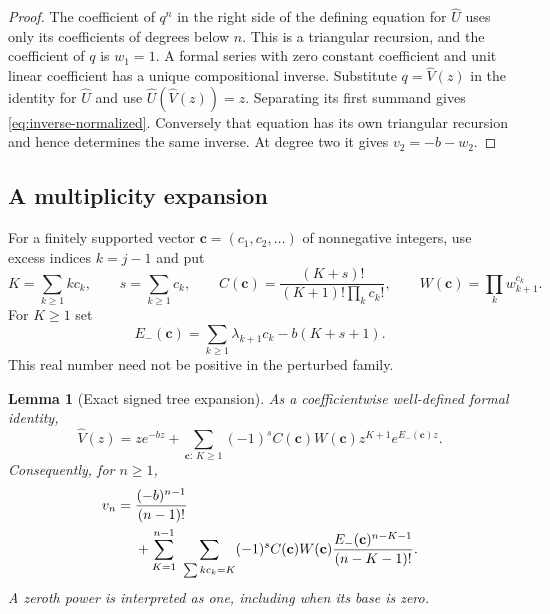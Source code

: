 \documentclass[11pt,a4paper]{article}
\numberwithin{equation}{section}
\newtheorem{lemma}[theorem]{Lemma}
\theoremstyle{definition}
\theoremstyle{remark}
\newcommand{\Uhat}{\widehat U}\newcommand{\Vhat}{\widehat V}
\begin{document}
\begin{proof}
The coefficient of $q^n$ in the right side of the defining equation for
$\Uhat$ uses only its coefficients of degrees below $n$. This is a
triangular recursion, and the coefficient of $q$ is $w_1=1$.
A formal series with zero constant coefficient and unit linear coefficient
has a unique compositional inverse. Substitute $q=\Vhat(z)$ in the
identity for $\Uhat$ and use $\Uhat(\Vhat(z))=z$. Separating its first
summand gives \eqref{eq:inverse-normalized}. Conversely that equation
has its own triangular recursion and hence determines the same inverse.
At degree two it gives $v_2=-b-w_2$.
\end{proof}

\subsection{A multiplicity expansion}

For a finitely supported vector $\mathbf c=(c_1,c_2,\ldots)$ of
nonnegative integers, use excess indices $k=j-1$ and put
\begin{equation}
 K=\sum_{k\ge1}k c_k,\qquad s=\sum_{k\ge1}c_k,\qquad
 C(\mathbf c)=\frac{(K+s)!}{(K+1)!\prod_k c_k!},\qquad
 W(\mathbf c)=\prod_k w_{k+1}^{c_k}.
 \label{eq:multiplicities}
\end{equation}
For $K\ge1$ set
\begin{equation}
 E_-(\mathbf c)=\sum_{k\ge1}\lambda_{k+1}c_k-b(K+s+1).
 \label{eq:minus-energy}
\end{equation}
This real number need not be positive in the perturbed family.

\begin{lemma}[Exact signed tree expansion]
\label{lem:tree}
As a coefficientwise well-defined formal identity,
\begin{equation}
 \Vhat(z)=z e^{-bz}
 +\sum_{\mathbf c:\,K\ge1}(-1)^s C(\mathbf c)W(\mathbf c)
                         z^{K+1}e^{E_-(\mathbf c)z}.
 \label{eq:tree}
\end{equation}
Consequently, for $n\ge1$,
\begin{align}
 v_n={}&\frac{(-b)^{n-1}}{(n-1)!}\notag\\
 &+\sum_{K=1}^{n-1}\ \sum_{\sum k c_k=K}
 (-1)^s C(\mathbf c)W(\mathbf c)
 \frac{E_-(\mathbf c)^{n-K-1}}{(n-K-1)!}.
 \label{eq:finite-tree}
\end{align}
A zeroth power is interpreted as one, including when its base is zero.
\end{lemma}
\end{document}
